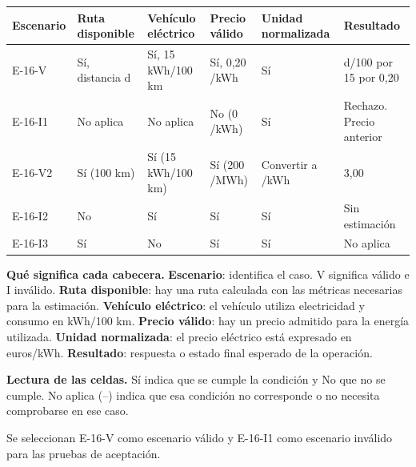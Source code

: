 \begingroup\fontsize{7.8}{11}\selectfont\setlength{\tabcolsep}{3pt}
\begin{tabularx}{\linewidth}{@{}*{6}{Y}@{}}\toprule
\textbf{Escenario} & \textbf{Ruta disponible} & \textbf{Vehículo eléctrico} & \textbf{Precio válido} & \textbf{Unidad normalizada} & \textbf{Resultado}\\\midrule
E-16-V & Sí, distancia d & Sí, 15 kWh/100 km & Sí, 0,20 \texteuro{}/kWh & Sí & d/100 por 15 por 0,20\\[3pt]
E-16-I1 & No aplica & No aplica & No (0 \texteuro{}/kWh) & Sí & Rechazo. Precio anterior\\[3pt]
E-16-V2 & Sí (100 km) & Sí (15 kWh/100 km) & Sí (200 \texteuro{}/MWh) & Convertir a \texteuro{}/kWh & 3,00 \texteuro{}\\[3pt]
E-16-I2 & No & Sí & Sí & Sí & Sin estimación\\[3pt]
E-16-I3 & Sí & No & Sí & Sí & No aplica\\[3pt]
\bottomrule\end{tabularx}\endgroup\par
{\fontsize{9}{11}\selectfont\textbf{Qué significa cada cabecera.} \textbf{Escenario}: identifica el caso. V significa válido e I inválido. \textbf{Ruta disponible}: hay una ruta calculada con las métricas necesarias para la estimación. \textbf{Vehículo eléctrico}: el vehículo utiliza electricidad y consumo en kWh/100 km. \textbf{Precio válido}: hay un precio admitido para la energía utilizada. \textbf{Unidad normalizada}: el precio eléctrico está expresado en euros/kWh. \textbf{Resultado}: respuesta o estado final esperado de la operación.\par\textbf{Lectura de las celdas.} Sí indica que se cumple la condición y No que no se cumple. No aplica (--) indica que esa condición no corresponde o no necesita comprobarse en ese caso.\par}


Se seleccionan E-16-V como escenario válido y E-16-I1 como escenario inválido para las pruebas de aceptación.\par



